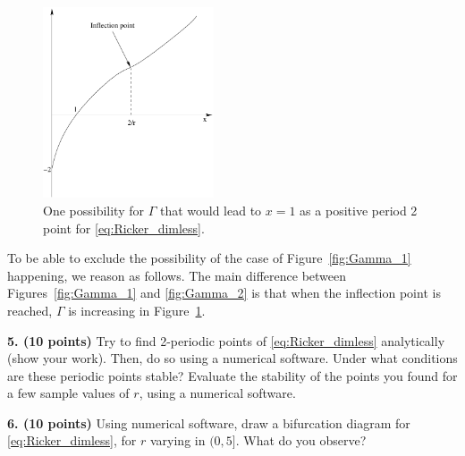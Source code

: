\documentclass[12pt]{article}
\theoremstyle{plain}
\begin{document}
\begin{figure}[htbp]
\begin{center}
\includegraphics[width=0.45\textwidth]{fig1_b}
\caption{One possibility for $\Gamma$ that would lead to $x=1$ as a positive period 2 point for \eqref{eq:Ricker_dimless}.}
\label{fig:Gamma_2}
\end{center}
\end{figure}

To be able to exclude the possibility of the case of Figure~\ref{fig:Gamma_1} happening, we reason as follows. The main difference between Figures~\ref{fig:Gamma_1} and \eqref{fig:Gamma_2} is that when the inflection point is reached, $\Gamma$ is increasing in Figure~\ref{fig:Gamma_2}.



\vskip0.4cm
\noindent
{\bf 5.  (10 points)} 
Try to find 2-periodic points of \eqref{eq:Ricker_dimless} analytically (show your work). Then, do so using a numerical software. Under what conditions are these periodic points stable? Evaluate the stability of the points you found for a few sample values of $r$, using a numerical software.

\vskip0.4cm
\noindent
{\bf 6. (10 points)} 
Using numerical software, draw a bifurcation diagram for \eqref{eq:Ricker_dimless}, for $r$ varying in $(0,5]$. What do you observe?
\end{document}
